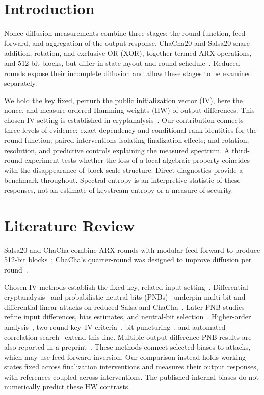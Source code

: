 \documentclass[electronics,article,submit,pdftex,oneauthor]{Definitions/mdpi}
\begin{document}
\section{Introduction}

Nonce diffusion measurements combine three stages: the round function, feed-forward, and aggregation of the output response. ChaCha20 and Salsa20 share addition, rotation, and exclusive OR (XOR), together termed ARX operations, and 512-bit blocks, but differ in state layout and round schedule~\citep{nir2018,bernstein2008salsa}. Reduced rounds expose their incomplete diffusion and allow these stages to be examined separately.

We hold the key fixed, perturb the public initialization vector (IV), here the nonce, and measure ordered Hamming weights (HW) of output differences. This chosen-IV setting is established in cryptanalysis~\citep{englund2007,fischer2008}. Our contribution connects three levels of evidence: exact dependency and conditional-rank identities for the round function; paired interventions isolating finalization effects; and rotation, resolution, and predictive controls explaining the measured spectrum. A third-round experiment tests whether the loss of a local algebraic property coincides with the disappearance of block-scale structure. Direct diagnostics provide a benchmark throughout. Spectral entropy is an interpretive statistic of these responses, not an estimate of keystream entropy or a measure of security.

\section{Literature Review}\label{sec:literature}\label{sec:related}

Salsa20 and ChaCha combine ARX rounds with modular feed-forward to produce 512-bit blocks~\citep{bernstein2008salsa,estream2008,nir2018}; ChaCha's quarter-round was designed to improve diffusion per round~\citep{bernstein2008chacha}.

Chosen-IV methods establish the fixed-key, related-input setting~\citep{englund2007,fischer2008,maitra2016}. Differential cryptanalysis~\citep{biham1991} and probabilistic neutral bits (PNBs)~\citep{aumasson2008} underpin multi-bit and differential-linear attacks on reduced Salsa and ChaCha~\citep{choudhuri2016,dey2017,beierle2020,coutinho2023}. Later PNB studies refine input differences, bias estimates, and neutral-bit selection~\citep{ghafoori2023,dey2024salsa,dey2024tit}. Higher-order analysis~\citep{ghafoori2024hodl}, two-round key--IV criteria~\citep{dey2025tosc}, bit puncturing~\citep{florez2025}, and automated correlation search~\citep{liu2026} extend this line. Multiple-output-difference PNB results are also reported in a preprint~\citep{paul2025}. These methods connect selected biases to attacks, which may use feed-forward inversion. Our comparison instead holds working states fixed across finalization interventions and measures their output responses, with references coupled across interventions. The published internal biases do not numerically predict these HW contrasts.
\end{document}
